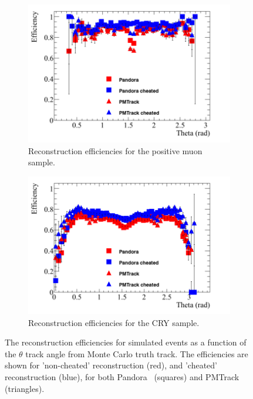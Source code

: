 \begin{figure}
  \centering
  \begin{subfigure}{0.48\textwidth}
    \centering
    \includegraphics[width=\textwidth]{Effic_AntiMuon_500V_All_Theta}
    \caption{Reconstruction efficiencies for the positive muon sample.}
    \label{fig:SimEffic_Theta_AMu}
  \end{subfigure}%
  \hspace{0.03\textwidth}%
  \begin{subfigure}{0.48\textwidth}
    \centering
    \includegraphics[width=\textwidth]{Effic_Cosmics_500V_All_Theta}
    \caption{Reconstruction efficiencies for the CRY sample.}
    \label{fig:SimEffic_Theta_CRY}
  \end{subfigure}
  \caption[The reconstruction efficiencies for simulated events as a function of the $\theta$ track angle from Monte Carlo truth track.]
          {The reconstruction efficiencies for simulated events as a function of the $\theta$ track angle from Monte Carlo truth track. The efficiencies are shown for 'non-cheated' reconstruction (red), and 'cheated' reconstruction (blue), for both Pandora~\citep{Pandora} (squares) and PMTrack~\citep{PMTrack} (triangles).}
          \label{fig:SimEffic_Theta}
\end{figure}

